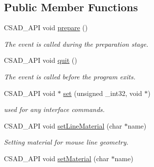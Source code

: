 \subsection*{Public Member Functions}
\begin{DoxyCompactItemize}
\item 
\hypertarget{classcsad_1_1_s_g_mouse_mesh_a6dbc5eaeb35808a682bd713fdbc0af9e}{C\-S\-A\-D\-\_\-\-A\-P\-I void \hyperlink{classcsad_1_1_s_g_mouse_mesh_a6dbc5eaeb35808a682bd713fdbc0af9e}{prepare} ()}\label{classcsad_1_1_s_g_mouse_mesh_a6dbc5eaeb35808a682bd713fdbc0af9e}

\begin{DoxyCompactList}\small\item\em The event is called during the preparation stage. \end{DoxyCompactList}\item 
\hypertarget{classcsad_1_1_s_g_mouse_mesh_a778567be046067f8afbabfbe43ac0449}{C\-S\-A\-D\-\_\-\-A\-P\-I void \hyperlink{classcsad_1_1_s_g_mouse_mesh_a778567be046067f8afbabfbe43ac0449}{quit} ()}\label{classcsad_1_1_s_g_mouse_mesh_a778567be046067f8afbabfbe43ac0449}

\begin{DoxyCompactList}\small\item\em The event is called before the program exits. \end{DoxyCompactList}\item 
\hypertarget{classcsad_1_1_s_g_mouse_mesh_a2ef2490d6609a4ea87bffca4de6a0476}{C\-S\-A\-D\-\_\-\-A\-P\-I void $\ast$ \hyperlink{classcsad_1_1_s_g_mouse_mesh_a2ef2490d6609a4ea87bffca4de6a0476}{set} (unsigned \-\_\-int32, void $\ast$)}\label{classcsad_1_1_s_g_mouse_mesh_a2ef2490d6609a4ea87bffca4de6a0476}

\begin{DoxyCompactList}\small\item\em used for any interface commands. \end{DoxyCompactList}\item 
\hypertarget{classcsad_1_1_s_g_mouse_mesh_a623caa5aac16b3d846b2d39a426d002a}{C\-S\-A\-D\-\_\-\-A\-P\-I void \hyperlink{classcsad_1_1_s_g_mouse_mesh_a623caa5aac16b3d846b2d39a426d002a}{set\-Line\-Material} (char $\ast$name)}\label{classcsad_1_1_s_g_mouse_mesh_a623caa5aac16b3d846b2d39a426d002a}

\begin{DoxyCompactList}\small\item\em Setting material for mouse line geometry. \end{DoxyCompactList}\item 
\hypertarget{classcsad_1_1_s_g_mouse_mesh_a3646d0f79c4f4999a1fd17f0285adbba}{C\-S\-A\-D\-\_\-\-A\-P\-I void \hyperlink{classcsad_1_1_s_g_mouse_mesh_a3646d0f79c4f4999a1fd17f0285adbba}{set\-Material} (char $\ast$name)}\label{classcsad_1_1_s_g_mouse_mesh_a3646d0f79c4f4999a1fd17f0285adbba}


\end{DoxyCompactItemize}
